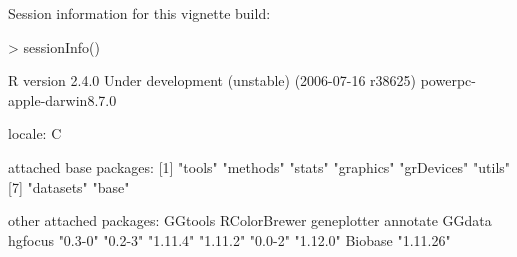 \documentclass[12pt]{article}
\begin{document}
Session information for this vignette build:
\begin{Schunk}
\begin{Sinput}
> sessionInfo()
\end{Sinput}
\begin{Soutput}
R version 2.4.0 Under development (unstable) (2006-07-16 r38625) 
powerpc-apple-darwin8.7.0 

locale:
C

attached base packages:
[1] "tools"     "methods"   "stats"     "graphics"  "grDevices" "utils"    
[7] "datasets"  "base"     

other attached packages:
     GGtools RColorBrewer  geneplotter     annotate       GGdata      hgfocus 
     "0.3-0"      "0.2-3"     "1.11.4"     "1.11.2"      "0.0-2"     "1.12.0" 
     Biobase 
   "1.11.26" 
\end{Soutput}
\end{Schunk}
\end{document}
